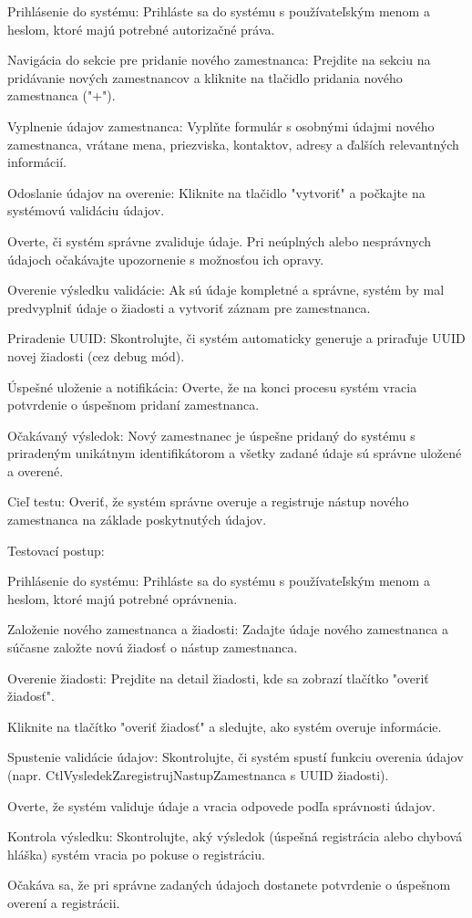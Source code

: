 \startitemize[n]
\item{Prihlásenie do systému: Prihláste sa do systému s používateľským menom a heslom, ktoré majú potrebné autorizačné práva.}
\item{Navigácia do sekcie pre pridanie nového zamestnanca: Prejdite na sekciu na pridávanie nových zamestnancov a kliknite na tlačidlo pridania nového zamestnanca ("+").}
\item{Vyplnenie údajov zamestnanca: Vyplňte formulár s osobnými údajmi nového zamestnanca, vrátane mena, priezviska, kontaktov, adresy a ďalších relevantných informácií.}
\item{Odoslanie údajov na overenie: Kliknite na tlačidlo "vytvoriť" a počkajte na systémovú validáciu údajov.}
\item{Overte, či systém správne zvaliduje údaje. Pri neúplných alebo nesprávnych údajoch očakávajte upozornenie s možnosťou ich opravy.}
\item{Overenie výsledku validácie: Ak sú údaje kompletné a správne, systém by mal predvyplniť údaje o žiadosti a vytvoriť záznam pre zamestnanca.}
\item{Priradenie UUID: Skontrolujte, či systém automaticky generuje a priraďuje UUID novej žiadosti (cez debug mód).}
\item{Úspešné uloženie a notifikácia: Overte, že na konci procesu systém vracia potvrdenie o úspešnom pridaní zamestnanca.}
\stopitemize

Očakávaný výsledok: Nový zamestnanec je úspešne pridaný do systému s priradeným unikátnym identifikátorom a všetky zadané údaje sú správne uložené a overené.



Cieľ testu: Overiť, že systém správne overuje a registruje nástup nového zamestnanca na základe poskytnutých údajov.

\blank
Testovací postup:

\startitemize[n]
\item{Prihlásenie do systému: Prihláste sa do systému s používateľským menom a heslom, ktoré majú potrebné oprávnenia.}
\item{Založenie nového zamestnanca a žiadosti: Zadajte údaje nového zamestnanca a súčasne založte novú žiadosť o nástup zamestnanca.}
\item{Overenie žiadosti: Prejdite na detail žiadosti, kde sa zobrazí tlačítko "overiť žiadosť".}
\item{Kliknite na tlačítko "overiť žiadosť" a sledujte, ako systém overuje informácie.}
\item{Spustenie validácie údajov: Skontrolujte, či systém spustí funkciu overenia údajov (napr. CtlVysledekZaregistrujNastupZamestnanca s UUID žiadosti).}
\item{Overte, že systém validuje údaje a vracia odpovede podľa správnosti údajov.}
\item{Kontrola výsledku: Skontrolujte, aký výsledok (úspešná registrácia alebo chybová hláška) systém vracia po pokuse o registráciu.}
\item{Očakáva sa, že pri správne zadaných údajoch dostanete potvrdenie o úspešnom overení a registrácii.}
\stopitemize

